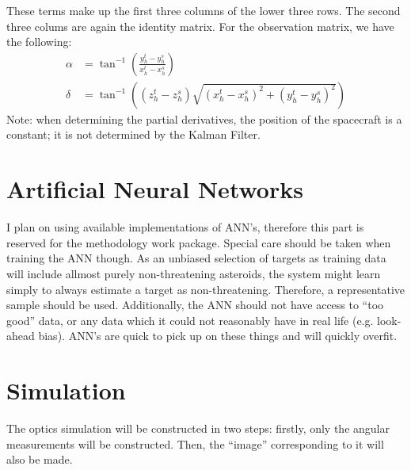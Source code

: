 \documentclass[a4paper,10pt]{article}
\begin{document}
These terms make up the first three columns of the lower three rows. The second three colums are again the identity matrix. For the observation matrix, we have the following:
\begin{align}
 \alpha &= \tan ^{-1} \left( \frac{ y_h^t - y_h^s}{x_h^t - x_h^s}\right) \\
 \delta &= \tan^{-1}\left(\left(z_h^t - z_h^s\right)\sqrt{\left(x_h^t - x_h^s\right)^2 + \left(y_h^t - y_h^s\right)^2}\right)
\end{align}
Note: when determining the partial derivatives, the position of the spacecraft is a constant; it is not determined by the Kalman Filter.



\section{Artificial Neural Networks}

I plan on using available implementations of ANN's, therefore this part is reserved for the methodology work package. Special care should be taken when training the ANN though. As an unbiased selection of targets as training data will include allmost purely non-threatening asteroids, the system might learn simply to always estimate a target as non-threatening. Therefore, a representative sample should be used. Additionally, the ANN should not have access to ``too good'' data, or any data which it could not reasonably have in real life (e.g. look-ahead bias). ANN's are quick to pick up on these things and will quickly overfit.

\section{Simulation}
The optics simulation will be constructed in two steps: firstly, only the angular measurements will be constructed. Then, the ``image'' corresponding to it will also be made.\\
\end{document}
